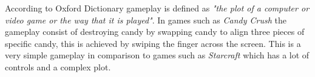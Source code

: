 According to Oxford Dictionary gameplay is defined as \textit{"the plot of a computer or video game or the way that it is played"}.
In games such as \textit{Candy Crush} the gameplay consist of destroying candy by swapping candy to align three pieces of specific candy, this is achieved by swiping the finger across the screen.
This is a very simple gameplay in comparison to games such as \textit{Starcraft}  which has a lot of controls and a complex plot.
